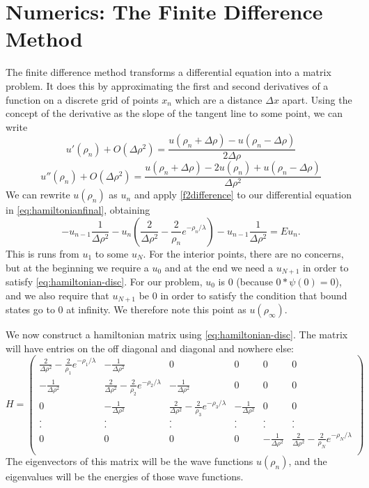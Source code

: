 \documentclass[12pt,twoside]{reedthesis}
\newcommand{\eqn}[1]{\begin{equation}#1\end{equation}}
\begin{document}
\section{Numerics: The Finite Difference Method}
The finite difference method transforms a differential equation into a matrix problem. It does this by approximating the first and second derivatives of a function on a discrete grid of points $x_n$ which are a distance $\Delta x$ apart. Using the concept of the derivative as the slope of the tangent line to some point, we can write
\eqn{
u'(\rho_n) + O(\Delta{\rho}^2) = \frac{u(\rho_n + \Delta \rho) - u(\rho_n - \Delta \rho)}{2 \Delta \rho}
\label{fdifference}
}
\eqn{
u''(\rho_n) + O(\Delta{\rho}^2) = \frac{u(\rho_n + \Delta \rho) - 2 u(\rho_n) + u(\rho_n - \Delta \rho)}{\Delta \rho^2}
\label{f2difference}
}
We can rewrite $u(\rho_n)$ as $u_n$ and apply \eqref{f2difference} to our differential equation in \eqref{eq:hamiltonianfinal}, obtaining
\eqn{
-u_{n-1}\frac{1}{\Delta \rho^2} - u_n\left(\frac{2} {\Delta \rho^2} -  \frac{2}{\rho_n}e^{-\rho_n/\lambda} \right) - u_{n-1}\frac{1}{\Delta \rho^2}  = E u_n\mbox{.}
\label{eq:hamiltonian-disc}
}
This is runs from $u_1$ to some $u_N$. For the interior points, there are no concerns, but at the beginning we require a $u_0$ and at the end we need a $u_{N+1}$ in order to satisfy \eqref{eq:hamiltonian-disc}. For our problem, $u_0$ is 0 (because $0 * \psi(0) = 0$), and we also require that $u_{N+1}$ be 0 in order to satisfy the condition that bound states go to 0 at infinity. We therefore note this point as $u(\rho_{\infty})$. 

We now construct a hamiltonian matrix using \eqref{eq:hamiltonian-disc}. The matrix will have entries on the off diagonal and diagonal and nowhere else:
\begin{equation*}H = \left(
\begin{array}{cccccc}
\frac{2} {\Delta \rho^2} -  \frac{2}{\rho_1}e^{-\rho_1/\lambda} & -\frac{1}{\Delta \rho^2} &  0 & 0 & 0 & 0 \\
-\frac{1}{\Delta \rho^2} & \frac{2} {\Delta \rho^2} -  \frac{2}{\rho_2}e^{-\rho_2/\lambda} &  -\frac{1}{\Delta \rho^2}  & 0 & 0 & 0 \\
0 &  -\frac{1}{\Delta \rho^2} & \frac{2} {\Delta \rho^2} -  \frac{2}{\rho_3}e^{-\rho_3/\lambda} &  -\frac{1}{\Delta \rho^2}  & 0 & 0 \\
 .&  . &.  &. & .& .  \\
 .& . & . & .& .&  . \\
0 & 0 &  0 & 0&  -\frac{1}{\Delta \rho^2} & \frac{2} {\Delta \rho^2} -  \frac{2}{\rho_N}e^{-\rho_N/\lambda}   \\
\end{array}
\right)
\end{equation*}
The eigenvectors of this matrix will be the wave functions $u(\rho_n)$, and the eigenvalues will be the energies of those wave functions.
\end{document}
